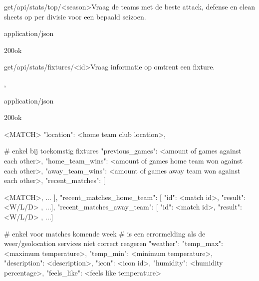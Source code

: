 \documentclass[10pt]{article}
\begin{document}
\begin{apiRoute}{get}{/api/stats/top/<season>}{Vraag de teams met de beste attack, defense en clean sheets op per divisie voor een bepaald seizoen.}
	\begin{routeParameter}
	\end{routeParameter}

	\begin{routeResponse}{application/json}
		\begin{routeResponseItem}{200}{ok}
			\begin{routeResponseItemBody}
			\end{routeResponseItemBody}
		\end{routeResponseItem}
	\end{routeResponse}
\end{apiRoute}

\begin{apiRoute}{get}{/api/stats/fixtures/<id>}{Vraag informatie op omtrent een fixture.}
	\begin{routeParameter}
		\routeParamItem{id}{match id}
	\end{routeParameter}
,
	\begin{routeResponse}{application/json}
		\begin{routeResponseItem}{200}{ok}
			\begin{routeResponseItemBody}
{
	<MATCH>
	"location": <home team club location>,

	# enkel bij toekomstig fixtures
	"previous_games": <amount of games against each other>,
	"home_team_wins": <amount of games home team won against each other>,
	"away_team_wins": <amount of games away team won against each other>,
	"recent_matches": [

		<MATCH>, ...
	],
	"recent_matches_home_team": [{
		"id": <match id>,
		"result": <W/L/D>
	}, ...],
	"recent_matches_away_team": [{
		"id": <match id>,
		"result": <W/L/D>
	}, ...]

	# enkel voor matches komende week
	# is een errormelding als de weer/geolocation services niet correct reageren
	"weather": {
		"temp_max": <maximum temperature>,
		"temp_min": <minimum temperature>,
		"description": <description>,
		"icon": <icon id>,
		"humidity": <humidity percentage>,
		"feels_like": <feels like temperature>
	}
}
			\end{routeResponseItemBody}
		\end{routeResponseItem}
	\end{routeResponse}
\end{apiRoute}
\end{document}
